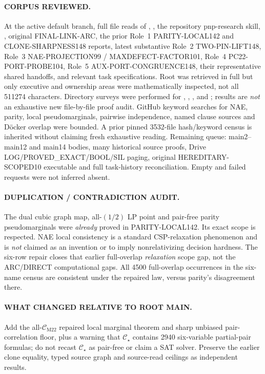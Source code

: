\documentclass[11pt]{article}
\newcommand{\CM}{\mathcal C_{\mathrm{M22}}}
\newcommand{\CS}{\mathcal C_\star}
\begin{document}
\paragraph{CORPUS REVIEWED.} At the active default branch, full file reads of , , the repository pnp-research skill, , original FINAL-LINK-ARC, the prior Role~1 PARITY-LOCAL142 and CLONE-SHARPNESS148 reports, latest substantive Role~2 TWO-PIN-LIFT148, Role~3 NAE-PROJECTION99 / MAXDEFECT-FACTOR101, Role~4 PC22-PORT-PROBE104, Role~5 AUX-PORT-CONGRUENCE148, their representative shared handoffs, and relevant task specifications. Root  was retrieved in full but only executive and ownership areas were mathematically inspected, not all 511274 characters. Directory surveys were performed for , , , and ; results are \emph{not} an exhaustive new file-by-file proof audit. GitHub keyword searches for NAE, parity, local pseudomarginals, pairwise independence, named clause sources and D\"ocker overlap were bounded. A prior pinned 3532-file hash/keyword census is inherited without claiming fresh exhaustive reading. Remaining queue: main2--main12 and main14 bodies, many historical source proofs, Drive LOG/PROVED\_EXACT/BOOL/SIL paging, original HEREDITARY-SCOPED10 executable and full task-history reconciliation. Empty and failed requests were not inferred absent.

\paragraph{DUPLICATION / CONTRADICTION AUDIT.} The dual cubic graph map, all-$(1/2)$ LP point and pair-free parity pseudomarginals were \emph{already} proved in PARITY-LOCAL142. Its exact scope is respected. NAE local consistency is a standard CSP-relaxation phenomenon and is \emph{not} claimed as an invention or to imply nonrelativizing decision hardness. The six-row repair closes that earlier full-overlap \emph{relaxation} scope gap, not the ARC/DIRECT computational gaps. All 4500 full-overlap occurrences in the six-name census are consistent under the repaired law, versus parity's disagreement there.

\paragraph{WHAT CHANGED RELATIVE TO ROOT MAIN.} Add the all-$\CM$ repaired local marginal theorem and sharp unbiased pair-correlation floor, plus a warning that $\CS$ contains 2940 six-variable partial-pair formulas; do not recast $\CS$ as pair-free or claim a SAT solver. Preserve the earlier clone equality, typed source graph and source-read ceilings as independent results.
\end{document}
